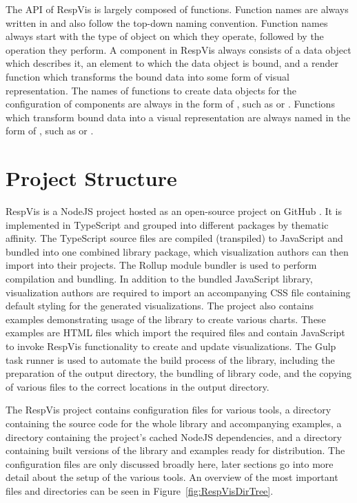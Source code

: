 The API of RespVis is largely composed of functions. Function names
are always written in  \parencite{camelCase} and also
follow the top-down naming convention. Function names always start
with the type of object on which they operate, followed by the
operation they perform. A component in RespVis always consists of a
data object which describes it, an element to which the data object is
bound, and a render function which transforms the bound data into some
form of visual representation. The names of functions to create data
objects for the configuration of components are always in the form of
, such as  or
. Functions which transform bound data into
a visual representation are always named in the form of
, such as  or
.






\section{Project Structure}
\label{sec:ProjectSetup}

RespVis is a NodeJS \parencite{NodeJS} project hosted as an
open-source project on GitHub \parencite{RespVisGitHub}. It is
implemented in TypeScript and grouped into different packages by
thematic affinity. The TypeScript source files are compiled
(transpiled) to JavaScript and bundled into one combined library
package, which visualization authors can then import into their
projects.
%
The Rollup module bundler \parencite{Rollup} is used to perform
compilation and bundling. In addition to the bundled JavaScript
library, visualization authors are required to import an accompanying
CSS file containing default styling for the generated visualizations.
The project also contains examples demonstrating usage of the library
to create various charts. These examples are HTML files which import
the required files and contain JavaScript to invoke RespVis
functionality to create and update visualizations.
%
The Gulp \parencite{Gulp} task runner is used to automate the build
process of the library, including the preparation of the output
directory, the bundling of library code, and the copying of various
files to the correct locations in the output directory.




The RespVis project contains configuration files for various tools, a
 directory containing the source code for the whole library
and accompanying examples, a  directory containing
the project's cached NodeJS dependencies, and a  directory
containing built versions of the library and examples ready for
distribution. The configuration files are only discussed broadly here,
later sections go into more detail about the setup of the various
tools. An overview of the most important files and directories can be
seen in Figure~\ref{fig:RespVisDirTree}.

